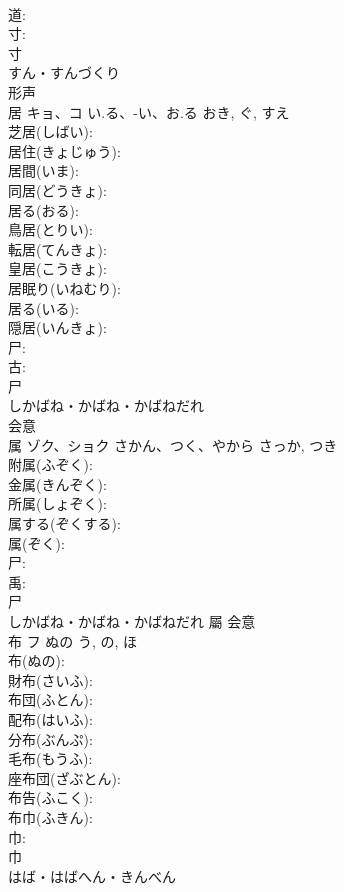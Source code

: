 \documentclass[8pt]{extreport}
\begin{document}
\begin{CJK}{UTF8}{min}
\\	道: 
\\	寸: 
\\	寸	
\\	すん・すんづくり	
\\	形声 
\\	居	キョ、コ	い.る、-い、お.る	おき, ぐ, すえ	
\\	芝居(しばい): 
\\	居住(きょじゅう): 
\\	居間(いま): 
\\	同居(どうきょ): 
\\	居る(おる): 
\\	鳥居(とりい): 
\\	転居(てんきょ): 
\\	皇居(こうきょ): 
\\	居眠り(いねむり): 
\\	居る(いる): 
\\	隠居(いんきょ): 
\\	尸: 
\\	古: 
\\	尸	
\\	しかばね・かばね・かばねだれ	
\\	会意 
\\	属	ゾク、ショク	さかん、つく、やから	さっか, つき	
\\	附属(ふぞく): 
\\	金属(きんぞく): 
\\	所属(しょぞく): 
\\	属する(ぞくする): 
\\	属(ぞく): 
\\	尸: 
\\	禹: 
\\	尸	
\\	しかばね・かばね・かばねだれ	屬	会意 
\\	布	フ	ぬの	う, の, ほ	
\\	布(ぬの): 
\\	財布(さいふ): 
\\	布団(ふとん): 
\\	配布(はいふ): 
\\	分布(ぶんぷ): 
\\	毛布(もうふ): 
\\	座布団(ざぶとん): 
\\	布告(ふこく): 
\\	布巾(ふきん): 
\\	巾: 
\\	巾	
\\	はば・はばへん・きんべん	

\end{CJK}
\end{document}

